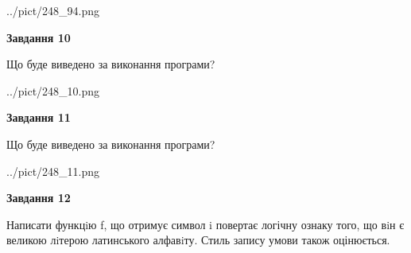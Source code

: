 \documentclass[12pt, ukrainian]{article}
\begin{document}
{\begin {large}
\begin{center}
	{../pict/248_94.png}
\end{center}
\newpage

{\begin {center}\textbf{Завдання 10}\end {center}}

Що буде виведено за виконання програми?\par
\begin{center}
	{../pict/248_10.png}
\end{center}
\newpage

{\begin {center}\textbf{Завдання 11}\end {center}}

Що буде виведено за виконання програми?\par
\begin{center}
	{../pict/248_11.png}
\end{center}
\newpage

{\begin {center}\textbf{Завдання 12}\end {center}}


Написати функцiю f, що отримує символ i повертає логічну ознаку того, що вiн є великою лiтерою латинського алфавiту. Стиль запису умови також оцінюється.\par
\newpage

\end {large}}
\end{document}
